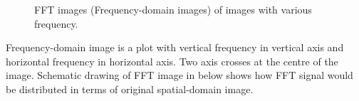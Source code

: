 \begin{figure}[htbp]
 \centering
 \caption{ FFT images (Frequency-domain images) of images with various frequency.}
 \label{fig:FFTtransformedStripesFrequencies}
\end{figure} 

Frequency-domain image is a plot with vertical frequency in vertical
axis and horizontal frequency in horizontal axis. Two axis crosses at
the centre of the image. Schematic drawing of FFT image in below shows
how FFT signal would be distributed in terms of original spatial-domain
image. 

